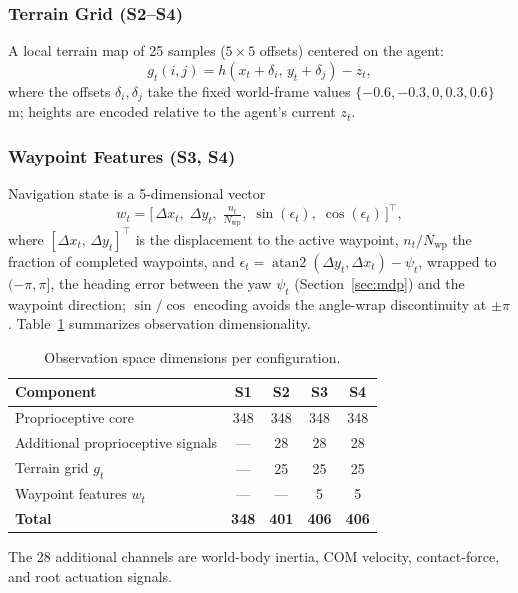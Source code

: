 \documentclass[conference,a4paper]{IEEEtran}
\begin{document}
\subsubsection{Terrain Grid (S2--S4)} A local terrain map of 25 samples ($5 \times 5$ offsets) centered on the agent:
\begin{equation}
\label{eq:terrain_grid}
g_t(i,j) = h(x_t + \delta_i,\, y_t + \delta_j) - z_t,
\end{equation}
where the offsets $\delta_i, \delta_j$ take the fixed world-frame values $\{-0.6, -0.3, 0, 0.3, 0.6\}$\,m; heights are encoded relative to the agent's current $z_t$.

\subsubsection{Waypoint Features (S3, S4)} Navigation state is a 5-dimensional vector
\begin{equation}
\label{eq:waypoint_signal}
w_t = \Big[\,\Delta x_t,\;\Delta y_t,\;\tfrac{n_t}{N_{\mathrm{wp}}},\;\sin(\epsilon_t),\;\cos(\epsilon_t)\,\Big]^{\top},
\end{equation}
where $[\Delta x_t,\, \Delta y_t]^{\top}$ is the displacement to the active waypoint, $n_t/N_{\mathrm{wp}}$ the fraction of completed waypoints, and $\epsilon_t = \operatorname{atan2}(\Delta y_t, \Delta x_t) - \psi_t$, wrapped to $(-\pi, \pi]$, the heading error between the yaw $\psi_t$ (Section~\ref{sec:mdp}) and the waypoint direction; $\sin/\cos$ encoding avoids the angle-wrap discontinuity at $\pm\pi$. Table~\ref{tab:obs_dims} summarizes observation dimensionality.

\begin{table}[t]
\caption{Observation space dimensions per configuration.}
\label{tab:obs_dims}
\centering
\footnotesize
\begin{tabular}{@{}lcccc@{}}
\toprule
\textbf{Component} & \textbf{S1} & \textbf{S2} & \textbf{S3} & \textbf{S4} \\
\midrule
Proprioceptive core & 348 & 348 & 348 & 348 \\
Additional proprioceptive signals & --- & 28 & 28 & 28 \\
Terrain grid $g_t$ & --- & 25 & 25 & 25 \\
Waypoint features $w_t$ & --- & --- & 5 & 5 \\
\midrule
\textbf{Total} & \textbf{348} & \textbf{401} & \textbf{406} & \textbf{406} \\
\bottomrule
\end{tabular}

\vspace{2pt}
{\raggedright\footnotesize The 28 additional channels are world-body inertia, COM velocity, contact-force, and root actuation signals.\par}
\end{table}
\end{document}

